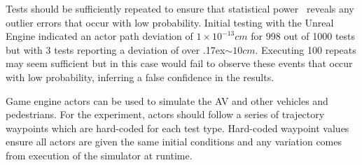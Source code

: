 Tests should be sufficiently repeated to ensure that statistical power~\cite{cohen2013statistical} reveals any outlier errors that occur with low probability. Initial testing with the Unreal Engine indicated an actor path deviation of $1\times10^{-13} cm$ for 998 out of 1000 tests but with 3 tests reporting a deviation of over {\raise.17ex\hbox{$\scriptstyle\sim$}}$10cm$. Executing 100 repeats may seem sufficient but in this case would fail to observe these events that occur with low probability, inferring a false confidence in the results.

Game engine actors can be used to simulate the AV and other vehicles and pedestrians. For the experiment, actors should follow a series of trajectory waypoints which are hard-coded for each test type. Hard-coded waypoint values ensure all actors are given the same initial conditions and any variation comes from execution of the simulator at runtime. %




